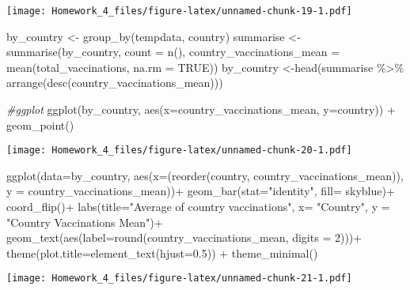 \documentclass[
]{article}
\newenvironment{Shaded}{\begin{snugshade}}{\end{snugshade}}
\newcommand{\AttributeTok}[1]{\textcolor[rgb]{0.77,0.63,0.00}{#1}}
\newcommand{\CommentTok}[1]{\textcolor[rgb]{0.56,0.35,0.01}{\textit{#1}}}
\newcommand{\ConstantTok}[1]{\textcolor[rgb]{0.00,0.00,0.00}{#1}}
\newcommand{\DecValTok}[1]{\textcolor[rgb]{0.00,0.00,0.81}{#1}}
\newcommand{\FloatTok}[1]{\textcolor[rgb]{0.00,0.00,0.81}{#1}}
\newcommand{\FunctionTok}[1]{\textcolor[rgb]{0.00,0.00,0.00}{#1}}
\newcommand{\NormalTok}[1]{#1}
\newcommand{\OtherTok}[1]{\textcolor[rgb]{0.56,0.35,0.01}{#1}}
\newcommand{\SpecialCharTok}[1]{\textcolor[rgb]{0.00,0.00,0.00}{#1}}
\newcommand{\StringTok}[1]{\textcolor[rgb]{0.31,0.60,0.02}{#1}}
\begin{document}
\texttt{[image: Homework\_4\_files/figure-latex/unnamed-chunk-19-1.pdf]}

\begin{Shaded}
\begin{Highlighting}[]
\NormalTok{by\_country }\OtherTok{\textless{}{-}} \FunctionTok{group\_by}\NormalTok{(tempdata, country)}
\NormalTok{summarise }\OtherTok{\textless{}{-}} \FunctionTok{summarise}\NormalTok{(by\_country, }\AttributeTok{count =} \FunctionTok{n}\NormalTok{(),}
\AttributeTok{country\_vaccinations\_mean =} \FunctionTok{mean}\NormalTok{(total\_vaccinations, }\AttributeTok{na.rm =} \ConstantTok{TRUE}\NormalTok{))}
\NormalTok{by\_country }\OtherTok{\textless{}{-}}\FunctionTok{head}\NormalTok{(summarise }\SpecialCharTok{\%\textgreater{}\%} \FunctionTok{arrange}\NormalTok{(}\FunctionTok{desc}\NormalTok{(country\_vaccinations\_mean)))}

\CommentTok{\#ggplot}
\FunctionTok{ggplot}\NormalTok{(by\_country, }\FunctionTok{aes}\NormalTok{(}\AttributeTok{x=}\NormalTok{country\_vaccinations\_mean, }\AttributeTok{y=}\NormalTok{country)) }\SpecialCharTok{+} \FunctionTok{geom\_point}\NormalTok{()}
\end{Highlighting}
\end{Shaded}

\texttt{[image: Homework\_4\_files/figure-latex/unnamed-chunk-20-1.pdf]}

\begin{Shaded}
\begin{Highlighting}[]
\FunctionTok{ggplot}\NormalTok{(}\AttributeTok{data=}\NormalTok{by\_country, }\FunctionTok{aes}\NormalTok{(}\AttributeTok{x=}\NormalTok{(}\FunctionTok{reorder}\NormalTok{(country, country\_vaccinations\_mean)), }\AttributeTok{y =}\NormalTok{ country\_vaccinations\_mean))}\SpecialCharTok{+}
  \FunctionTok{geom\_bar}\NormalTok{(}\AttributeTok{stat=}\StringTok{"identity"}\NormalTok{, }\AttributeTok{fill=} \StringTok{\textquotesingle{}skyblue\textquotesingle{}}\NormalTok{)}\SpecialCharTok{+} \FunctionTok{coord\_flip}\NormalTok{()}\SpecialCharTok{+}
  \FunctionTok{labs}\NormalTok{(}\AttributeTok{title=}\StringTok{"Average of country vaccinations"}\NormalTok{, }\AttributeTok{x=} \StringTok{"Country"}\NormalTok{, }\AttributeTok{y =} \StringTok{"Country Vaccinations Mean"}\NormalTok{)}\SpecialCharTok{+}
  \FunctionTok{geom\_text}\NormalTok{(}\FunctionTok{aes}\NormalTok{(}\AttributeTok{label=}\FunctionTok{round}\NormalTok{(country\_vaccinations\_mean, }\AttributeTok{digits =} \DecValTok{2}\NormalTok{)))}\SpecialCharTok{+}
  \FunctionTok{theme}\NormalTok{(}\AttributeTok{plot.title=}\FunctionTok{element\_text}\NormalTok{(}\AttributeTok{hjust=}\FloatTok{0.5}\NormalTok{)) }\SpecialCharTok{+} \FunctionTok{theme\_minimal}\NormalTok{()}
\end{Highlighting}
\end{Shaded}

\texttt{[image: Homework\_4\_files/figure-latex/unnamed-chunk-21-1.pdf]}
\end{document}
